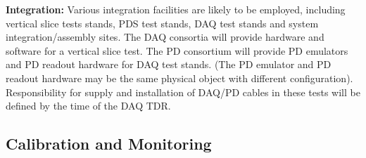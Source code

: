 \textbf{Integration:} Various integration facilities are likely to be employed, including vertical slice tests stands, PDS test stands, DAQ test stands and system integration/assembly sites. The DAQ consortia will provide hardware and software for a vertical slice test. The PD consortium will provide PD emulators and PD readout hardware for DAQ test stands. (The PD emulator and PD readout hardware may be the same physical object with different configuration). Responsibility for supply and installation of DAQ/PD cables in these tests will be defined by the time of the DAQ TDR.



\subsection{Calibration and Monitoring}
\label{sec:fdsp-pd-intfc-calib}




